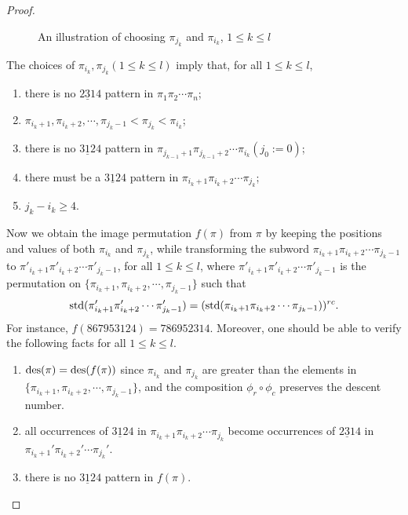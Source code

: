 \begin{proof}
\begin{figure}[ht]
    \caption{An illustration of choosing $\pi_{j_k}$ and $\pi_{i_k}$, $1\le k\le l$}
    \label{fig:312-4}
  \end{figure}

  The choices of $\pi_{i_k},\pi_{j_k}(1\le k \le l)$ imply that,  
  for all $1\le k \le l$, 
  \begin{enumerate}[label=(\roman*)]
      \item there is no $\underline{231}4$ pattern in $\pi_1\pi_2\cdots \pi_{n}$;
      \item $\pi_{i_k+1},\pi_{i_k+2},\cdots ,\pi_{j_k-1}<\pi_{j_k}<\pi_{i_k}$;
      \item there is no $\underline{312}4$ pattern in $\pi_{j_{k-1}+1}\pi_{j_{k-1}+2}\cdots \pi_{i_{k}}(j_{0}:=0)$;
      \item there must be a $\underline{312}4$ pattern in $\pi_{i_k+1} \pi_{i_k+2}\cdots \pi_{j_k}$;
      \item $j_k-i_k\ge 4$.
  \end{enumerate}
  Now we obtain the image permutation $f(\pi)$ from $\pi$ by keeping the positions and values of both $\pi_{i_k}$ and $\pi_{j_k}$, while transforming the subword $\pi_{i_k+1}\pi_{i_k+2}\cdots \pi_{j_{k}-1}$ to $\pi'_{i_k+1}\pi'_{i_k+2}\cdots \pi'_{j_k-1}$, for all $1\le k\le l$, where
  $\pi'_{i_k+1}\pi'_{i_k+2}\cdots \pi'_{j_k-1}$ is the permutation on
  $\{\pi_{i_k+1},\pi_{i_k+2},\cdots, \pi_{j_k-1}\}$ such that
  $$\mathrm{std}(\pi'_{i_k+1}\pi'_{i_k+2}\cdots \pi'_{j_k-1})=(\mathrm{std} (\pi_{i_k+1}\pi_{i_k+2}\cdots \pi_{j_k-1}))^{rc}.$$
  For instance, $f(867953124)=786952314$. Moreover, one should be able to verify the following facts for all $1\le k \le l$.
  \begin{enumerate}[label=(\roman*)]
      \item $\mathrm{des}(\pi)=\mathrm{des}(f(\pi))$ since $\pi_{i_k}$ and $\pi_{j_k}$ are greater than 
      the elements in \\ $\{\pi_{i_k+1},\pi_{i_k+2},\cdots, \pi_{j_k-1}\}$, and the composition $\phi_r\circ\phi_c$ preserves the descent number.
      \item all occurrences of $\underline{312}4$ in $\pi_{i_k+1} \pi_{i_k+2}\cdots \pi_{j_k}$ become occurrences of $\underline{231}4$ in $\pi_{i_k+1}' \pi_{i_k+2}'\cdots \pi_{j_k}'$.
      \item there is no $\underline{312}4$ pattern in $f(\pi)$.

\end{enumerate}
\end{proof}
